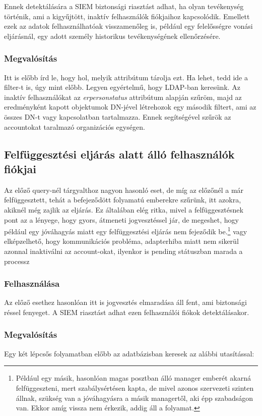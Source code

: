		Ennek detektálására a SIEM biztonsági riasztást adhat, ha olyan tevékenység történik, ami a kigyűjtött, inaktív felhasználók fiókjaihoz kapcsolódik. Emellett ezek az adatok felhasználhatóak visszamenőleg is, például egy felelősségre vonási eljárásnál, egy adott személy historikus tevékenységének ellenőrzésére.
		 
	\subsubsection{Megvalósítás}
		
		\laci Itt is előbb írd le, hogy hol, melyik attribútum tárolja ezt. Ha lehet, tedd ide a filter-t is, úgy mint előbb. Legyen egyértelmű, hogy LDAP-ban keresünk.
		Az inaktív felhasználókat az \textit{erpersonstatus} attribútum alapján szűröm, majd az eredményként kapott objektumok DN-jével létrehozok egy második filtert, ami az összes DN-t vagy kapcsolatban tartalmazza. Ennek segítségével szűrök az accountokat taralmazó organizációs egységen.
		
\subsection{Felfüggesztési eljárás alatt álló felhasználók fiókjai}
Az előző query-nél tárgyalthoz nagyon hasonló eset, de míg az előzőnél a már felfüggesztett, tehát a befejeződött folyamatú emberekre szűrünk, itt azokra, akiknél még zajlik az eljárás. Ez általában elég ritka, mivel a felfüggesztésnek pont az a lényege, hogy gyors, átmeneti jogvesztéssel jár, de megeshet, hogy például egy jóváhagyás miatt egy felfüggesztési eljárás nem fejeződik be.\footnote{Például egy másik, hasonlóan magas posztban álló manager emberét akarná felfüggeszteni, mert szabálysértésen kapta, de mivel azonos szervezeti szinten állnak, szükség van a jóváhagyásra a másik managertől, aki épp szabadságon van. Ekkor amíg vissza nem érkezik, addig áll a folyamat.}
\laci vagy elképzelhető, hogy kommunikációs probléma, adapterhiba miatt nem sikerül azonnal inaktiválni az account-okat, ilyenkor is pending státuszban marada a processz
	\subsubsection{Felhasználása}
		Az előző esethez hasonlóan itt is jogvesztés elmaradása áll fent, ami biztonsági réssel fenyeget. A SIEM riasztást adhat ezen felhasználói fiókok detektálásakor. 
	\subsubsection{Megvalósítás}
		Egy két lépcsős folyamatban előbb az adatbázisban keresek az alábbi utasítással:
		
